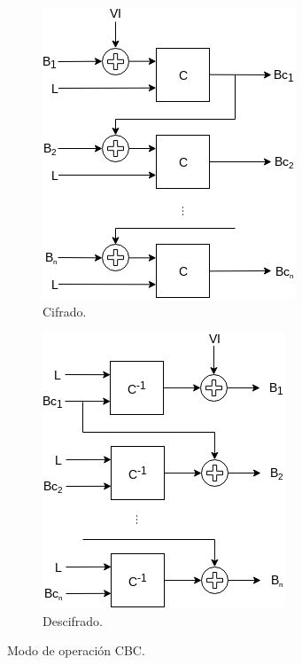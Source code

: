 \begin{figure}[H]
  \centering
  \begin{subfigure}{0.45\textwidth}
      \begin{center}
          \includegraphics[width=0.7\linewidth]
            {contenidos/antecedentes/modos/diagramas/modo_cbc.png}
          \caption{Cifrado.}
      \end{center}
  \end{subfigure}
  \begin{subfigure}{0.45\textwidth}
      \begin{center}
          \includegraphics[width=0.7\linewidth]
            {contenidos/antecedentes/modos/diagramas/modo_cbc_inverso.png}
          \caption{Descifrado.}
      \end{center}
  \end{subfigure}
  \caption{Modo de operación CBC.}
  \label{figura:cbc}
\end{figure}

